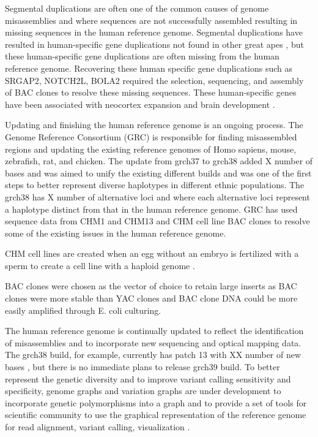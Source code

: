 Segmental duplications are often one of the common causes of genome misassemblies and where sequences are not successfully assembled resulting in missing sequences in the human reference genome\cite{}. Segmental duplications have resulted in human-specific gene duplications not found in other great apes \cite{}, but these human-specific gene duplications are often missing from the human reference genome. Recovering these human specific gene duplications such as SRGAP2, NOTCH2L, BOLA2 required the selection, sequencing, and assembly of BAC clones to resolve these missing sequences. These human-specific genes have been associated with neocortex expansion and brain development \cite{}.

Updating and finishing the human reference genome is an ongoing process. The Genome Reference Consortium (GRC) is responsible for finding misassembled regions and updating the existing reference genomes of Homo sapiens, mouse, zebrafish, rat, and chicken. The update from grch37 to grch38 added X number of bases and was aimed to unify the existing different builds and was one of the first steps to better represent diverse haplotypes in different ethnic populations. The grch38 has X number of alternative loci and where each alternative loci represent a haplotype distinct from that in the human reference genome. GRC has used sequence data from CHM1 and CHM13 and CHM cell line BAC clones to resolve some of the existing issues in the human reference genome. 

CHM cell lines are created when an egg without an embryo is fertilized with a sperm to create a cell line with a haploid genome \cite{}. 

BAC clones were chosen as the vector of choice to retain large inserts as BAC clones were more stable than YAC clones and BAC clone DNA could be more easily amplified through E. coli culturing. 


The human reference genome is continually updated to reflect the identification of misassemblies and to incorporate new sequencing and optical mapping data. The grch38 build, for example, currently has patch 13 with XX number of new bases \cite{}, but there is no immediate plans to release grch39 build. To better represent the genetic diversity and to improve variant calling sensitivity and specificity, genome graphs and variation graphs are under development to incorporate genetic polymorphisms into a graph and to provide a set of tools for scientific community to use the graphical representation of the reference genome for read alignment, variant calling, visualization \cite{}. 

